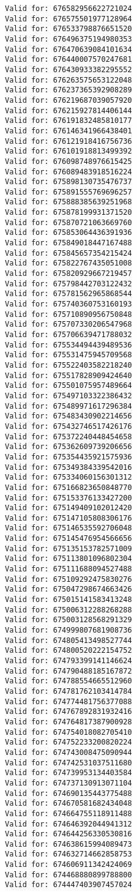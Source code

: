\documentclass[11pt]{article}
\begin{document}
\begin{Verbatim}[commandchars=\\\{\}]
Valid for: 676582956622721024
Valid for: 676575501977128964
Valid for: 676533798876651520
Valid for: 676496375194980353
Valid for: 676470639084101634
Valid for: 676440007570247681
Valid for: 676430933382295552
Valid for: 676263575653122048
Valid for: 676237365392908289
Valid for: 676219687039057920
Valid for: 676215927814406144
Valid for: 676191832485810177
Valid for: 676146341966438401
Valid for: 676121918416756736
Valid for: 676101918813499392
Valid for: 676098748976615425
Valid for: 676089483918516224
Valid for: 675898130735476737
Valid for: 675891555769696257
Valid for: 675888385639251968
Valid for: 675878199931371520
Valid for: 675870721063669760
Valid for: 675853064436391936
Valid for: 675849018447167488
Valid for: 675845657354215424
Valid for: 675822767435051008
Valid for: 675820929667219457
Valid for: 675798442703122432
Valid for: 675781562965868544
Valid for: 675740360753160193
Valid for: 675710890956750848
Valid for: 675707330206547968
Valid for: 675706639471788032
Valid for: 675534494439489536
Valid for: 675531475945709568
Valid for: 675522403582218240
Valid for: 675517828909424640
Valid for: 675501075957489664
Valid for: 675497103322386432
Valid for: 675489971617296384
Valid for: 675483430902214656
Valid for: 675432746517426176
Valid for: 675372240448454658
Valid for: 675362609739206656
Valid for: 675354435921575936
Valid for: 675349384339542016
Valid for: 675334060156301312
Valid for: 675166823650848770
Valid for: 675153376133427200
Valid for: 675149409102012420
Valid for: 675147105808306176
Valid for: 675146535592706048
Valid for: 675145476954566656
Valid for: 675135153782571009
Valid for: 675113801096802304
Valid for: 675111688094527488
Valid for: 675109292475830276
Valid for: 675047298674663426
Valid for: 675015141583413248
Valid for: 675006312288268288
Valid for: 675003128568291329
Valid for: 674999807681908736
Valid for: 674805413498527744
Valid for: 674800520222154752
Valid for: 674793399141146624
Valid for: 674790488185167872
Valid for: 674788554665512960
Valid for: 674781762103414784
Valid for: 674774481756377088
Valid for: 674767892831932416
Valid for: 674764817387900928
Valid for: 674754018082705410
Valid for: 674752233200820224
Valid for: 674743008475090944
Valid for: 674742531037511680
Valid for: 674739953134403584
Valid for: 674737130913071104
Valid for: 674690135443775488
Valid for: 674670581682434048
Valid for: 674664755118911488
Valid for: 674646392044941312
Valid for: 674644256330530816
Valid for: 674638615994089473
Valid for: 674632714662858753
Valid for: 674606911342424069
Valid for: 674468880899788800
Valid for: 674447403907457024

\end{Verbatim}
\end{document}

